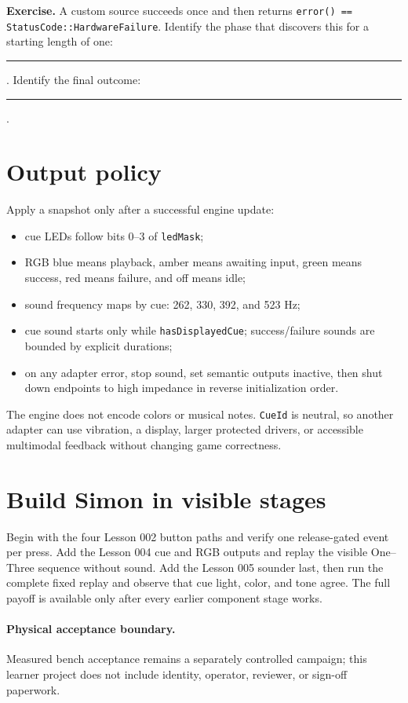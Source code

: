 \documentclass[11pt]{article}
\newcommand{\blank}[1]{\rule{#1}{0.4pt}}
\begin{document}
\textbf{Exercise.} A custom source succeeds once and then returns
\texttt{error() == StatusCode::HardwareFailure}. Identify the phase that discovers this for a
starting length of one: \blank{2.0in}. Identify the final outcome:
\blank{1.4in}.

\section{Output policy}

Apply a snapshot only after a successful engine update:

\begin{itemize}
  \item cue LEDs follow bits 0--3 of \texttt{ledMask};
  \item RGB blue means playback, amber means awaiting input, green means
        success, red means failure, and off means idle;
  \item sound frequency maps by cue: 262, 330, 392, and 523 Hz;
  \item cue sound starts only while \texttt{hasDisplayedCue}; success/failure
        sounds are bounded by explicit durations;
  \item on any adapter error, stop sound, set semantic outputs inactive, then
        shut down endpoints to high impedance in reverse initialization order.
\end{itemize}

The engine does not encode colors or musical notes. \texttt{CueId} is neutral,
so another adapter can use vibration, a display, larger protected drivers, or
accessible multimodal feedback without changing game correctness.

\section{Build Simon in visible stages}

Begin with the four Lesson 002 button paths and verify one release-gated event
per press. Add the Lesson 004 cue and RGB outputs and replay the visible
One--Three sequence without sound. Add the Lesson 005 sounder last, then run
the complete fixed replay and observe that cue light, color, and tone agree.
The full payoff is available only after every earlier component stage works.

\paragraph{Physical acceptance boundary.}
Measured bench acceptance remains a separately controlled campaign; this
learner project does not include identity, operator, reviewer, or sign-off
paperwork.
\end{document}
